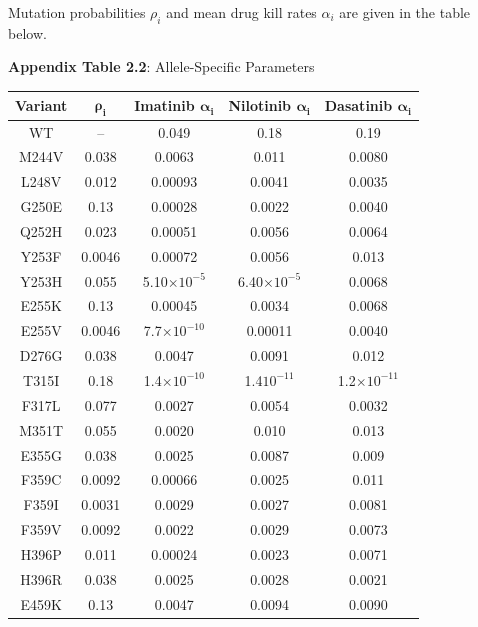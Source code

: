 \documentclass{article}
\begin{document}
Mutation probabilities $\rho_i$ and mean drug kill rates $\alpha_i$ are given in the table below.
\begin{center}
\textbf{Appendix Table 2.2}: Allele-Specific Parameters
\begin{tabular}{|| c || c | c | c | c ||} 
 \hline
  \textbf{Variant} & $\mathbf{\rho_i}$ & \textbf{Imatinib} $\mathbf{\alpha_i}$ & \textbf{Nilotinib} $\mathbf{\alpha_i}$ & \textbf{Dasatinib} $\mathbf{\alpha_i}$ \\ [0.5ex] 
 \hline\hline
WT    & --     & 0.049    & 0.18     & 0.19      \\ \hline
M244V & 0.038  & 0.0063   & 0.011    & 0.0080   \\ \hline
L248V & 0.012  & 0.00093  & 0.0041   & 0.0035   \\ \hline
G250E & 0.13   & 0.00028  & 0.0022   & 0.0040   \\ \hline
Q252H & 0.023  & 0.00051  & 0.0056   & 0.0064    \\ \hline
Y253F & 0.0046 & 0.00072  & 0.0056   & 0.013     \\ \hline
Y253H & 0.055  & 5.10$\times 10^{-5}$ & 6.40$\times 10^{-5}$ & 0.0068   \\ \hline
E255K & 0.13   & 0.00045  & 0.0034   & 0.0068   \\ \hline
E255V & 0.0046 & 7.7$\times 10^{-10}$  & 0.00011  & 0.0040   \\ \hline
D276G & 0.038  & 0.0047   & 0.0091   & 0.012     \\ \hline
T315I & 0.18   & 1.4$\times 10^{-10}$  & 1.4$10^{-11}$  & 1.2$\times 10^{-11}$       \\ \hline
F317L & 0.077  & 0.0027   & 0.0054   & 0.0032   \\ \hline
M351T & 0.055  & 0.0020   & 0.010    & 0.013     \\ \hline
E355G & 0.038  & 0.0025   & 0.0087   & 0.009     \\ \hline
F359C & 0.0092 & 0.00066  & 0.0025   & 0.011     \\ \hline
F359I & 0.0031 & 0.0029   & 0.0027   & 0.0081    \\ \hline
F359V & 0.0092 & 0.0022   & 0.0029   & 0.0073    \\ \hline
H396P & 0.011  & 0.00024  & 0.0023   & 0.0071   \\ \hline
H396R & 0.038  & 0.0025   & 0.0028   & 0.0021   \\ \hline
E459K & 0.13   & 0.0047   & 0.0094   & 0.0090   \\ \hline
\end{tabular}
\end{center}
\end{document}
